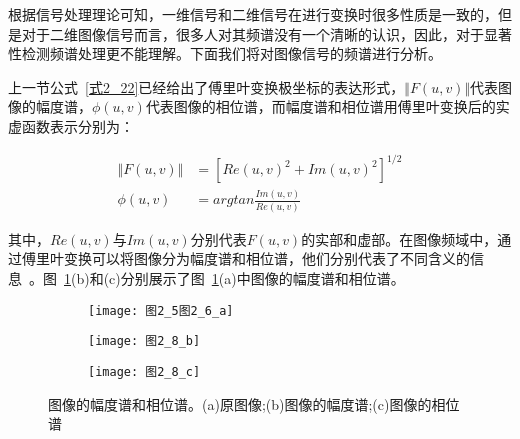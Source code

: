 根据信号处理理论可知，一维信号和二维信号在进行变换时很多性质是一致的，但是对于二维图像信号而言，很多人对其频谱没有一个清晰的认识，因此，对于显著性检测频谱处理更不能理解。下面我们将对图像信号的频谱进行分析。

上一节公式~\ref{式2_22}已经给出了傅里叶变换极坐标的表达形式，$\Vert F(u,v)\Vert$代表图像的幅度谱，$\phi(u,v)$代表图像的相位谱，而幅度谱和相位谱用傅里叶变换后的实虚函数表示分别为：
\begin{linenomath}
\begin{align}
\Vert F(u,v)\Vert &= [Re(u,v)^{2}+Im(u,v)^{2}]^{1/2}\label{式2_35}\\
\phi(u,v) &= arg tan\frac{Im(u,v)}{Re(u,v)}\label{式2_36}
\end{align}
\end{linenomath}
其中，$Re(u,v)$与$Im(u,v)$分别代表$F(u,v)$的实部和虚部。在图像频域中，通过傅里叶变换可以将图像分为幅度谱和相位谱，他们分别代表了不同含义的信息~\cite{ZhangRuolan2002frequency}。图~\ref{图2_8}(b)和(c)分别展示了图~\ref{图2_8}(a)中图像的幅度谱和相位谱。
\begin{figure}[h]
  \centering%
  \begin{subfigure}{3cm}
    \texttt{[image: 图2\_5图2\_6\_a]}
    \caption{}
  \end{subfigure}
  \hspace{4em}%
  \begin{subfigure}{0.2\textwidth}
    \texttt{[image: 图2\_8\_b]}
    \caption{}
  \end{subfigure}
  \hspace{4em}%
  \begin{subfigure}{0.25\textwidth}
    \texttt{[image: 图2\_8\_c]}
    \caption{}
  \end{subfigure}
  \caption{图像的幅度谱和相位谱。(a)原图像;(b)图像的幅度谱;(c)图像的相位谱}
  \label{图2_8}
\end{figure}

